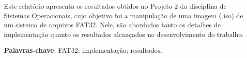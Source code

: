 \documentclass[
    12pt,				%
    oneside,   	        %
    a4paper,			%
    english,			%
    french,				%
    spanish,			%
    brazil,				%
    ]{pacotes/abntex2}
\begin{document}
\frenchspacing 



\imprimirfolhaderosto



\begin{resumo}
Este relatório apresenta os resultados obtidos no Projeto 2 da disciplina de Sistemas Operacionais, cujo objetivo foi a manipulação de uma imagem (.iso) de um sistema de arquivos FAT32. Nele, são abordados tanto os detalhes de implementação quanto os resultados alcançados no desenvolvimento do trabalho.

 \vspace{\onelineskip}
    
 \noindent
 \textbf{Palavras-chave}: FAT32; implementação; resultados.
\end{resumo}



\end{document}
